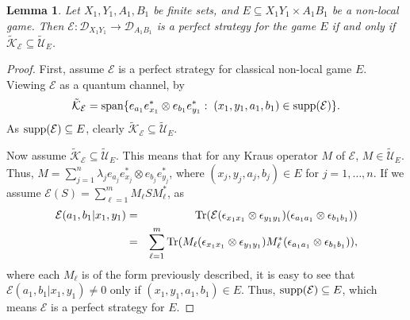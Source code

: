 \documentclass[11pt]{amsart}
\newtheorem{lemma}[theorem]{Lemma}
\newcommand{\cl}[1]{\mathcal{#1}}
\begin{document}
\begin{lemma}\label{classical_perfect_strats}
Let $X_{1}, Y_{1}, A_{1}, B_{1}$ be finite sets, and $E \subseteq X_{1}Y_{1}\times A_{1}B_{1}$ be a non-local game. Then $\cl{E}: \cl{D}_{X_{1}Y_{1}}\rightarrow \cl{D}_{A_{1}B_{1}}$ is a perfect strategy for the game $E$ if and only if $\tilde{\cl{K}}_{\cl{E}} \subseteq \tilde{\cl{U}}_{E}$. 
\end{lemma}
\begin{proof}
First, assume $\cl{E}$ is a perfect strategy for classical non-local game $E$. Viewing $\cl{E}$ as a quantum channel, by \cite[Remark 4.3]{gt_two} 
\begin{gather*}
	\tilde{\cl{K}}_{\cl{E}} = {\rm span}\{e_{a_{1}}e_{x_{1}}^{*}\otimes e_{b_{1}}e_{y_{1}}^{*}: \; (x_{1}, y_{1}, a_{1}, b_{1}) \in {\rm supp}(\cl{E})\}.
\end{gather*}
\noindent As ${\rm supp}(\cl{E}) \subseteq E$, clearly $\tilde{\cl{K}}_{\cl{E}} \subseteq \tilde{\cl{U}}_{E}$.

Now assume $\tilde{\cl{K}}_{\cl{E}} \subseteq \tilde{\cl{U}}_{E}$. This means that for any Kraus operator $M$ of $\cl{E}$, $M \in \tilde{\cl{U}}_{E}$. Thus, $M = \sum_{j=1}^{n}\lambda_{j}e_{a_{j}}e_{x_{j}}^{*}\otimes e_{b_{j}}e_{y_{j}}^{*}$, where $(x_{j}, y_{j}, a_{j}, b_{j}) \in E$ for $j = 1, \hdots, n$. If we assume $\cl{E}(S) = \sum\limits_{\ell=1}^{m}M_{\ell}SM_{\ell}^{*}$, as
\begin{eqnarray*}
	\cl{E}(a_{1}, b_{1}|x_{1}, y_{1}) 
& = &
{\rm Tr}(\cl{E}(\epsilon_{x_{1}x_{1}}\otimes \epsilon_{y_{1}y_{1}})(\epsilon_{a_{1}a_{1}}\otimes \epsilon_{b_{1}b_{1}})) \\
& = &
\sum\limits_{\ell=1}^{m}{\rm Tr}(M_{\ell}(\epsilon_{x_{1}x_{1}}\otimes \epsilon_{y_{1}y_{1}})M_{\ell}^{*}(\epsilon_{a_{1}a_{1}}\otimes \epsilon_{b_{1}b_{1}})),
\end{eqnarray*}
\noindent where each $M_{\ell}$ is of the form previously described, it is easy to see that $\cl{E}(a_{1}, b_{1}|x_{1}, y_{1}) \neq 0$ only if $(x_{1}, y_{1}, a_{1}, b_{1}) \in E$. Thus, ${\rm supp}(\cl{E}) \subseteq E$, which means $\cl{E}$ is a perfect strategy for $E$.
\end{proof}
\end{document}
